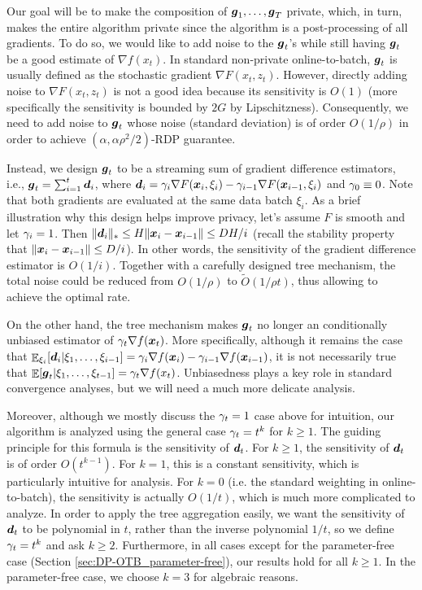 Our goal will be to make the composition of ${\boldsymbol{g}}_1,\dots,{\boldsymbol{g}}_T$ private, which, in turn, makes the entire algorithm private since the algorithm is a post-processing of all gradients. To do so, we would like to add noise to the ${\boldsymbol{g}}_t$'s while still having ${\boldsymbol{g}}_t$ be a good estimate of $\nabla f(x_t)$. 
In standard non-private online-to-batch, ${\boldsymbol{g}}_t$ is usually defined as the stochastic gradient $\nabla F(x_t,z_t)$. However, directly adding noise to $\nabla F(x_t,z_t)$ is not a good idea because its sensitivity is $O(1)$ (more specifically the sensitivity is bounded by $2G$ by Lipschitzness). Consequently, we need to add noise to ${\boldsymbol{g}}_t$ whose noise (standard deviation) is of order $O(1/\rho)$ in order to achieve $(\alpha, \alpha\rho^2/2)$-RDP guarantee.

Instead, we design ${\boldsymbol{g}}_t$ to be a streaming sum of gradient difference estimators, i.e., ${\boldsymbol{g}}_t=\sum_{i=1}^t {\boldsymbol{d}}_i$, where ${\boldsymbol{d}}_i=\gamma_i\nabla F({\boldsymbol{x}}_i,\xi_i)-\gamma_{i-1}\nabla F({\boldsymbol{x}}_{i-1},\xi_i)$ and $\gamma_0\equiv 0$. Note that both gradients are evaluated at the same data batch $\xi_i$.
As a brief illustration why this design helps improve privacy, let's assume $F$ is smooth and let $\gamma_i=1$. Then $\|{\boldsymbol{d}}_i\|_*\le H\|{\boldsymbol{x}}_i-{\boldsymbol{x}}_{i-1}\|\le DH/i$ (recall the stability property that $\|{\boldsymbol{x}}_i-{\boldsymbol{x}}_{i-1}\|\le D/i$). In other words, the sensitivity of the gradient difference estimator is $O(1/i)$. Together with a carefully designed tree mechanism, the total noise could be reduced from $O(1/\rho)$ to $\tilde O(1/\rho t)$, thus allowing to achieve the optimal rate.

On the other hand, the tree mechanism makes ${\boldsymbol{g}}_t$ no longer an conditionally unbiased estimator of $\gamma_t\nabla f({\boldsymbol{x}}_t)$. More specifically, although it remains the case that $\mathop{\mathbb{E}}_{\xi_i}[{\boldsymbol{d}}_i|\xi_1,\ldots,\xi_{i-1}]=\gamma_i\nabla f({\boldsymbol{x}}_i)-\gamma_{i-1}\nabla f({\boldsymbol{x}}_{i-1})$, it is not necessarily true that $\mathop{\mathbb{E}}[{\boldsymbol{g}}_t|\xi_1,\ldots,\xi_{t-1}]= \gamma_t\nabla f(x_t)$. Unbiasedness plays a key role in standard convergence analyses, but we will need a much more delicate analysis. 

Moreover, although we mostly discuss the $\gamma_t =1$ case above for intuition, our algorithm is analyzed using the general case $\gamma_t = t^k$ for $k\ge 1$. The guiding principle for this formula is the sensitivity of ${\boldsymbol{d}}_t$. For $k\ge 1$, the sensitivity of ${\boldsymbol{d}}_t$ is of order $O(t^{k-1})$. For $k=1$, this is a constant sensitivity, which is particularly intuitive for analysis. For $k=0$ (i.e. the standard weighting in online-to-batch), the sensitivity is actually $O(1/t)$, which is much more complicated to analyze. In order to apply the tree aggregation easily, we want the sensitivity of ${\boldsymbol{d}}_t$ to be polynomial in $t$, rather than the inverse polynomial $1/t$, so we define $\gamma_t=t^k$ and ask $k\ge 2$.
Furthermore, in all cases except for the parameter-free case (Section \ref{sec:DP-OTB_parameter-free}), our results hold for all $k\geq 1$. In the parameter-free case, we choose $k=3$ for algebraic reasons.

